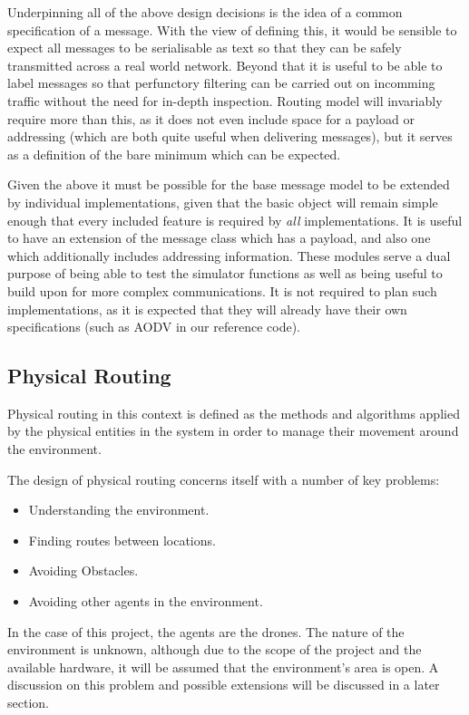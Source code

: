 Underpinning all of the above design decisions is the idea of a common specification of a message. With the view of defining this, it would be sensible to expect all messages to be serialisable as text so that they can be safely transmitted across a real world network. Beyond that it is useful to be able to label messages so that perfunctory filtering can be carried out on incomming traffic without the need for in-depth inspection. Routing model will invariably require more than this, as it does not even include space for a payload or addressing (which are both quite useful when delivering messages), but it serves as a definition of the bare minimum which can be expected. 

Given the above it must be possible for the base message model to be extended by individual implementations, given that the basic object will remain simple enough that every included feature is required by \textit{all} implementations. It is useful to have an extension of the message class which has a payload, and also one which additionally includes addressing information. These modules serve a dual purpose of being able to test the simulator functions as well as being useful to build upon for more complex communications. It is not required to plan such implementations, as it is expected that they will already have their own specifications (such as AODV in our reference code).
		
\subsection{Physical Routing} 

Physical routing in this context is defined as the methods and algorithms applied by the physical entities in the system in order to manage their movement around the environment.

The design of physical routing concerns itself with a number of key problems:
\begin{itemize}
\item Understanding the environment.
\item Finding routes between locations.
\item Avoiding Obstacles.
\item Avoiding other agents in the environment.
\end{itemize}

In the case of this project, the agents are the drones. The nature of the environment is unknown, although due to the scope of the project and the available hardware, it will be assumed that the environment's area is open. A discussion on this problem and possible extensions will be discussed in a later section.

